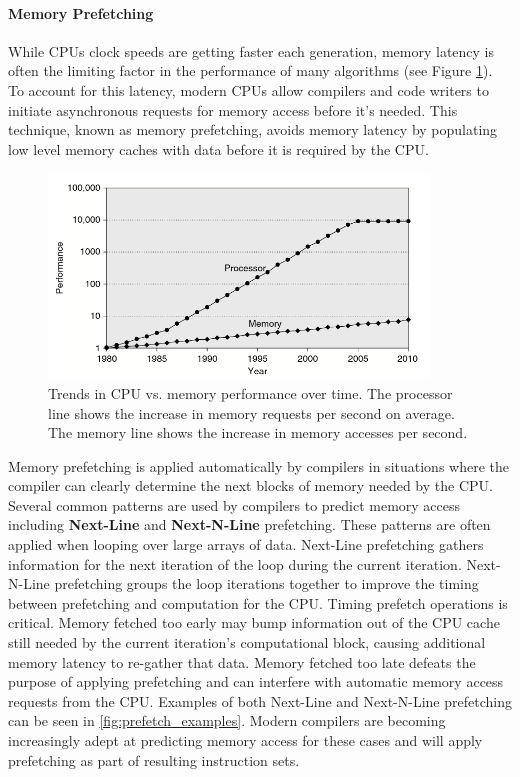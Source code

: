 \paragraph{Memory Prefetching}

While CPUs clock speeds are getting faster each generation, memory latency is
often the limiting factor in the performance of many algorithms (see Figure
\ref{fig:memory_latency}). To account for this latency, modern CPUs allow
compilers and code writers to initiate asynchronous requests for memory access
before it's needed. This technique, known as memory prefetching, avoids memory
latency by populating low level memory caches with data before it is required by
the CPU.

\begin{figure}[H]
\centering
\includegraphics[width=0.9\textwidth]{../images/mem_latency.png}
\caption[Memory latency comparison over time.]{Trends in CPU vs. memory
  performance over time. The processor line shows the increase in memory
  requests per second on average. The memory line shows the increase in memory
  accesses per second. \cite{Hennessy_2012}}
\label{fig:memory_latency}
\end{figure}

Memory prefetching is applied automatically by compilers in situations where the
compiler can clearly determine the next blocks of memory needed by the
CPU. Several common patterns are used by compilers to predict memory access
including \textbf{Next-Line} and \textbf{Next-N-Line} prefetching. These
patterns are often applied when looping over large arrays of data. Next-Line
prefetching gathers information for the next iteration of the loop during the
current iteration. Next-N-Line prefetching groups the loop iterations together
to improve the timing between prefetching and computation for the CPU. Timing
prefetch operations is critical. Memory fetched too early may bump information
out of the CPU cache still needed by the current iteration's computational
block, causing additional memory latency to re-gather that data. Memory fetched
too late defeats the purpose of applying prefetching and can interfere with
automatic memory access requests from the CPU. Examples of both Next-Line and
Next-N-Line prefetching can be seen in \ref{fig:prefetch_examples}. Modern
compilers are becoming increasingly adept at predicting memory access for these
cases and will apply prefetching as part of resulting instruction sets.

